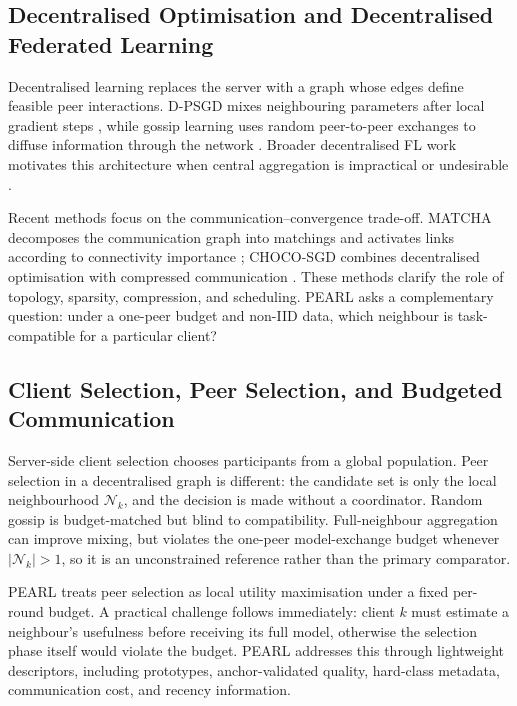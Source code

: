 \documentclass[conference]{IEEEtran}
\begin{document}
\subsection{Decentralised Optimisation and Decentralised Federated Learning}
\label{subsec:decentralised-optimisation-and-decentralised-feder}
Decentralised learning replaces the server with a graph whose edges define feasible peer interactions. D-PSGD mixes neighbouring parameters after local gradient steps \cite{lian2017decentralized}, while gossip learning uses random peer-to-peer exchanges to diffuse information through the network \cite{ormandi2013gossip,hegedus2019gossip}. Broader decentralised FL work motivates this architecture when central aggregation is impractical or undesirable \cite{yuan2023decentralized}.

Recent methods focus on the communication--convergence trade-off. MATCHA decomposes the communication graph into matchings and activates links according to connectivity importance \cite{wang2019matcha}; CHOCO-SGD combines decentralised optimisation with compressed communication \cite{koloskova2019choco}. These methods clarify the role of topology, sparsity, compression, and scheduling. PEARL asks a complementary question: under a one-peer budget and non-IID data, which neighbour is task-compatible for a particular client?

\subsection{Client Selection, Peer Selection, and Budgeted Communication}
\label{subsec:client-selection-peer-selection-and-communication}
Server-side client selection chooses participants from a global population. Peer selection in a decentralised graph is different: the candidate set is only the local neighbourhood \(\mathcal{N}_k\), and the decision is made without a coordinator. Random gossip is budget-matched but blind to compatibility. Full-neighbour aggregation can improve mixing, but violates the one-peer model-exchange budget whenever \( |\mathcal{N}_k|>1 \), so it is an unconstrained reference rather than the primary comparator.

PEARL treats peer selection as local utility maximisation under a fixed per-round budget. A practical challenge follows immediately: client \(k\) must estimate a neighbour's usefulness before receiving its full model, otherwise the selection phase itself would violate the budget. PEARL addresses this through lightweight descriptors, including prototypes, anchor-validated quality, hard-class metadata, communication cost, and recency information.
\end{document}

